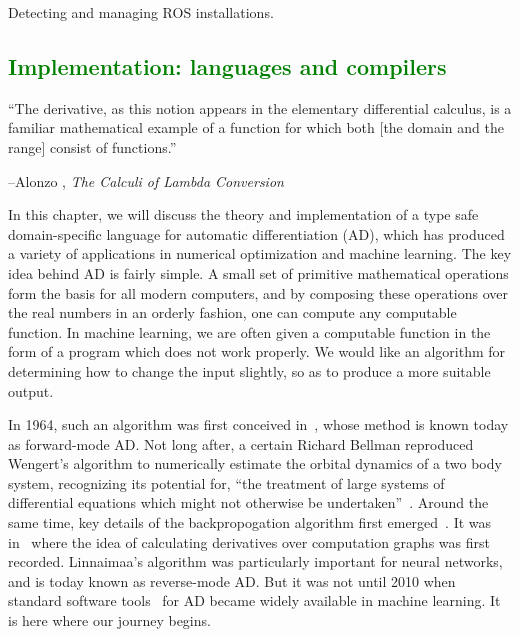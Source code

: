 \documentclass[12pt,initial,twoside,maitrise]{dms}
\newcommand{\welldone}[1]{\textcolor{green}{#1}}
\numberwithin{equation}{section}
\numberwithin{table}{chapter}
\numberwithin{figure}{chapter}
\begin{document}
Detecting and managing ROS installations.

\welldone{\chapter{Implementation: languages and compilers}\label{ch:kotlingrad}}

\setlength{\epigraphwidth}{0.7\textwidth}
\epigraph{``The derivative, as this notion appears in the elementary differential calculus, is a familiar mathematical example of a function for which both [the domain and the range] consist of functions.''}{\begin{flushright}--Alonzo \citet{church1985calculi}, \textit{The Calculi of Lambda Conversion}\end{flushright}}

In this chapter, we will discuss the theory and implementation of a type safe domain-specific language for automatic differentiation (AD), which has produced a variety of applications in numerical optimization and machine learning. The key idea behind AD is fairly simple. A small set of primitive mathematical operations form the basis for all modern computers, and by composing these operations over the real numbers in an orderly fashion, one can compute any computable function. In machine learning, we are often given a computable function in the form of a program which does not work properly. We would like an algorithm for determining how to change the input slightly, so as to produce a more suitable output.

In 1964, such an algorithm was first conceived in~\citet{wengert1964simple}, whose method is known today as forward-mode AD. Not long after, a certain Richard Bellman reproduced Wengert's algorithm to numerically estimate the orbital dynamics of a two body system, recognizing its potential for, ``the treatment of large systems of differential equations which might not otherwise be undertaken''~\citep{bellman1965wengert}. Around the same time, key details of the backpropogation algorithm first emerged~\citep{dreyfus1990artificial}. It was in~\citet{linnainmaa1970representation} where the idea of calculating derivatives over computation graphs was first recorded. Linnaimaa's algorithm was particularly important for neural networks, and is today known as reverse-mode AD. But it was not until 2010 when standard software tools~\citep{bergstra2010theano} for AD became widely available in machine learning. It is here where our journey begins.
\end{document}

